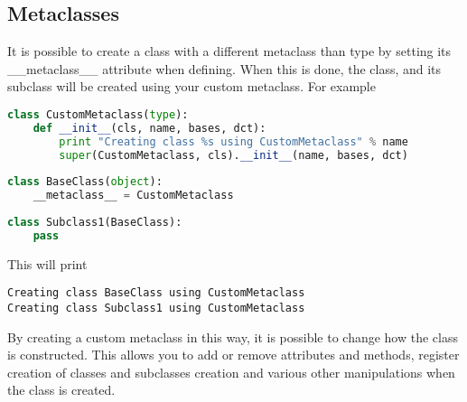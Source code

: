 \subsection{Metaclasses}
It is possible to create a class with a different metaclass than type by setting
its \_\_metaclass\_\_ attribute when defining. When this is done, the class, and its
subclass will be created using your custom metaclass. For example
\lstset{basicstyle=\scriptsize, numbers=left, captionpos=b, tabsize=4}
\begin{lstlisting}[caption=Custom Meta Class,language={Python},
xleftmargin=15pt, label=lst:custommetaclass]
class CustomMetaclass(type):
    def __init__(cls, name, bases, dct):
        print "Creating class %s using CustomMetaclass" % name
        super(CustomMetaclass, cls).__init__(name, bases, dct)
 
class BaseClass(object):
    __metaclass__ = CustomMetaclass
 
class Subclass1(BaseClass):
    pass
\end{lstlisting}
This will print
\scriptsize
\begin{verbatim}
Creating class BaseClass using CustomMetaclass
Creating class Subclass1 using CustomMetaclass
\end{verbatim}
\normalsize
By creating a custom metaclass in this way, it is possible to change how the
class is constructed. This allows you to add or remove attributes and methods,
register creation of classes and subclasses creation and various other
manipulations when the class is created.
